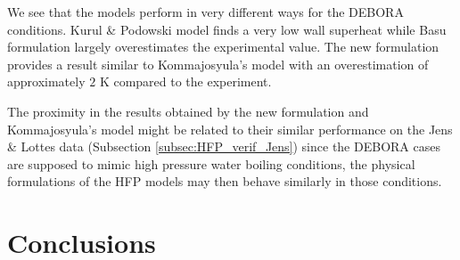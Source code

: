 We see that the models perform in very different ways for the DEBORA conditions. Kurul \& Podowski model finds a very low wall superheat while Basu \etal formulation largely overestimates the experimental value. The new formulation provides a result similar to Kommajosyula's model with an overestimation of approximately $2$ K compared to the experiment.

\begin{remark*}{}
The proximity in the results obtained by the new formulation and Kommajosyula's model might be related to their similar performance on the Jens \& Lottes data (Subsection \ref{subsec:HFP_verif_Jens}) since the DEBORA cases are supposed to mimic high pressure water boiling conditions, the physical formulations of the HFP models may then behave similarly in those conditions.
\end{remark*}


\section{Conclusions}


